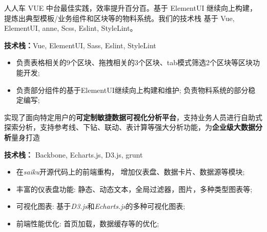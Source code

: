 \documentclass{resume}
\begin{document}



\begin{onehalfspacing}
人人车 VUE 中台最佳实践，效率提升百分百。基于 ElementUI 继续向上构建，提炼出典型模板/业务组件和区块等的物料系统。我们的技术栈 基于 Vue, ElementUI, anne, Scss, Eslint, StyleLint。


\textbf{技术栈：}Vue, ElementUI, Sass, Eslint, StyleLint
\begin{itemize}
  \item 负责表格相关的9个区块、拖拽相关的3个区块、tab模式筛选2个区块等区块功能开发;
  \item 负责部分组件的基于ElementUI继续向上构建和维护; 负责物料系统的部分稳定编写;
\end{itemize}
\end{onehalfspacing}


\begin{onehalfspacing}
实现了面向特定用户的\textbf{可定制敏捷数据可视化分析平台}，支持业务人员进行自助式探索分析，支持参考线、下钻、联动、表计算等强大分析功能，为\textbf{企业级大数据分析}量身打造


\textbf{技术栈：} Backbone, Echarts.js, D3.js, grunt
\begin{itemize}
  \item 在\textit{saiku}开源代码上的前端重构， 增加仪表盘、数据卡片、数据源等模块;
  \item 丰富的仪表盘功能: 静态、动态文本，全局过滤器，图片，多种类型图表等;
  \item 可视化图表: 基于\textit{D3.js}和\textit{Echarts.js}的多种可视化图表;
  \item 前端性能优化: 首页加载，数据缓存等的优化;
\end{itemize}
\end{onehalfspacing}
\end{document}
